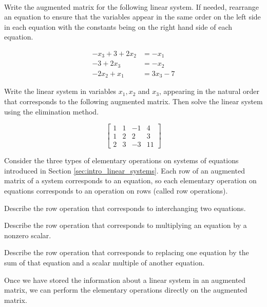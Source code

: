 \begin{pa} \label{pa:1_b} ~
\be 
\item Write the augmented matrix for the following linear system. If needed, rearrange an equation to ensure that the variables appear in the same order on the left side in each equation with the constants being on the right hand side of each equation. 

\begin{equation}
\begin{split}
-x_3 + 3 + 2x_2&= -x_1   \\
-3 + 2x_3 &= -x_2  \\
-2x_2 + x_1 &= 3x_3-7 
\end{split} 
\end{equation} 


\item Write the linear system in variables $x_1, x_2$ and $x_3$, appearing in the natural order that corresponds to the following augmented matrix. Then solve the linear system using the elimination method.

\[\left[ \begin{array}{rrr|r} 1 & 1 & -1 & 4 \\ 1 & 2 & 2 & 3 \\ 2 & 3 & -3 & 11 \end{array} \right]\]


\item Consider the three types of elementary operations on systems of equations introduced in Section \ref{sec:intro_linear_systems}. Each row of an augmented matrix of a system corresponds to an equation, so each elementary operation on equations corresponds to an operation on rows (called row operations). 
	\ba
	\item Describe the row operation that corresponds to interchanging two equations.
	\item Describe the row operation that corresponds to multiplying an equation by a nonzero scalar.
	\item Describe the row operation that corresponds to replacing one equation by the sum of that equation and a scalar multiple of another equation.
	\ea
 

\ee

\end{pa}


\label{sec:simp_mtx_sys}

Once we have stored the information about a linear system in an augmented matrix, we can perform the elementary operations directly on the augmented matrix. 

